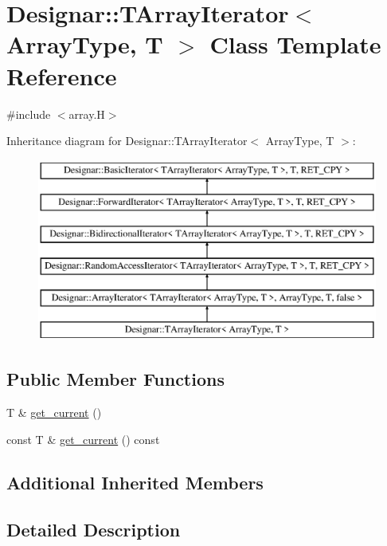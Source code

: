 \hypertarget{class_designar_1_1_t_array_iterator}{}\section{Designar\+:\+:T\+Array\+Iterator$<$ Array\+Type, T $>$ Class Template Reference}
\label{class_designar_1_1_t_array_iterator}


{\ttfamily \#include $<$array.\+H$>$}

Inheritance diagram for Designar\+:\+:T\+Array\+Iterator$<$ Array\+Type, T $>$\+:\begin{figure}[H]
\begin{center}
\leavevmode
\includegraphics[height=6.000000cm]{class_designar_1_1_t_array_iterator}
\end{center}
\end{figure}
\subsection*{Public Member Functions}
\begin{DoxyCompactItemize}
\item 
T \& \hyperlink{class_designar_1_1_t_array_iterator_a1d627df3d5e97047d904e743ccab0731}{get\+\_\+current} ()
\item 
const T \& \hyperlink{class_designar_1_1_t_array_iterator_ab7f3127bd70958a362a18f91a199a72b}{get\+\_\+current} () const
\end{DoxyCompactItemize}
\subsection*{Additional Inherited Members}


\subsection{Detailed Description}
